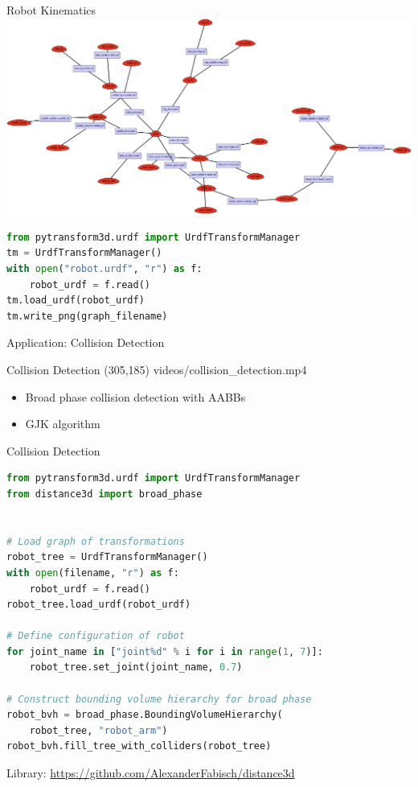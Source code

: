 \documentclass[14pt]{beamer}
\begin{document}
\begin{frame}[fragile]{Robot Kinematics}
\includegraphics[width=\textwidth]{images/embodiment_graph}
\begin{lstlisting}[language=Python]
from pytransform3d.urdf import UrdfTransformManager
tm = UrdfTransformManager()
with open("robot.urdf", "r") as f:
    robot_urdf = f.read()
tm.load_urdf(robot_urdf)
tm.write_png(graph_filename)
\end{lstlisting}
\end{frame}

\begin{frame}
\begin{center}
\Large
Application: Collision Detection
\end{center}
\end{frame}

\begin{frame}{Collision Detection}
\makebox(305,185){
{videos/collision_detection.mp4}}
\begin{itemize}
\item Broad phase collision detection with AABBs
\item GJK algorithm \parencite{Gilbert1988}
\end{itemize}
\end{frame}

\begin{frame}[fragile]{Collision Detection}
\begin{lstlisting}[language=Python]
from pytransform3d.urdf import UrdfTransformManager
from distance3d import broad_phase


# Load graph of transformations
robot_tree = UrdfTransformManager()
with open(filename, "r") as f:
    robot_urdf = f.read()
robot_tree.load_urdf(robot_urdf)

# Define configuration of robot
for joint_name in ["joint%d" % i for i in range(1, 7)]:
    robot_tree.set_joint(joint_name, 0.7)

# Construct bounding volume hierarchy for broad phase
robot_bvh = broad_phase.BoundingVolumeHierarchy(
    robot_tree, "robot_arm")
robot_bvh.fill_tree_with_colliders(robot_tree)
\end{lstlisting}
{\footnotesize Library: \url{https://github.com/AlexanderFabisch/distance3d}}
\end{frame}
\end{document}
